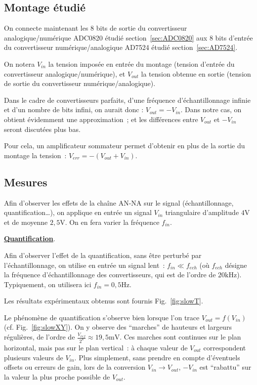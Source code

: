 \documentclass{article}
\begin{document}
\subsection{Montage étudié}

On connecte maintenant les 8 bits de sortie du convertisseur analogique/numérique ADC0820 étudié section~\ref{sec:ADC0820} aux 8 bits d'entrée du convertisseur numérique/analogique AD7524 étudié section~\ref{sec:AD7524}.

On notera $V_{in}$ la tension imposée en entrée du montage (tension d'entrée du convertisseur analogique/numérique), et $V_{out}$ la tension obtenue en sortie (tension de sortie du convertisseur numérique/analogique). 

Dans le cadre de convertisseurs parfaits, d'une fréquence d'échantillonnage infinie et d'un nombre de bits infini, on aurait donc : $V_{out}=-V_{in}$. Dans notre cas, on obtient évidemment une approximation~; et les différences entre $V_{out}$ et $-V_{in}$ seront discutées plus bas.

Pour cela, un amplificateur sommateur permet d'obtenir en plus de la sortie du montage la tension~: ${V_{err}=-(V_{out}+V_{in})}$.

\subsection{Mesures}


Afin d'observer les effets de la chaîne AN-NA sur le signal (échantillonnage, quantification\dots), on applique en entrée un signal $V_{in}$ triangulaire d'amplitude $4\mathrm{V}$ et de moyenne $2,5\mathrm{V}$. On en fera varier la fréquence $f_{in}$.

\noindent \textbf{\underline{Quantification}}.

Afin d'observer l'effet de la quantification, sans être perturbé par l'échantillonnage, on utilise en entrée un signal lent~: $f_{in}\ll f_{ech}$ (où $f_{ech}$ désigne la fréquence d'échantillonnage des convertisseurs, qui est de l'ordre de $20\mathrm{kHz}$). Typiquement, on utilisera ici $f_{in} = \mathrm{0,5 Hz}$.

Les résultats expérimentaux obtenus sont fournis Fig.~\ref{fig:slowT}.


Le phénomène de quantification s'observe bien lorsque l'on trace $V_{out}=f(V_{in})$ (cf. Fig.~\ref{fig:slowXY}). On y observe des ``marches'' de hauteurs et largeurs régulières, de l'ordre de $\frac{V_{ref}}{2^8}\approx\mathrm{19,5 mV}$. Ces marches sont continues sur le plan horizontal, mais pas sur le plan vertical~: à chaque valeur de $V_{out}$ correspondent plusieurs valeurs de $V_{in}$. Plus simplement, sans prendre en compte d'éventuels offsets ou erreurs de gain, lors de la conversion $V_{in}\rightarrow V_{out}$, $-V_{in}$ est ``rabattu'' sur la valeur la plus proche possible de $V_{out}$.
\end{document}
